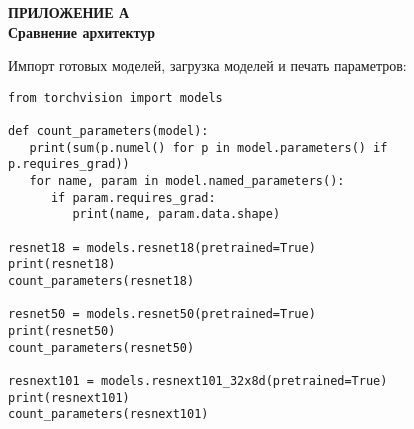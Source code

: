 \newpage
\begin{center}
	\textbf{ПРИЛОЖЕНИЕ А\\ Сравнение архитектур}
\end{center}
Импорт готовых моделей, загрузка моделей и печать параметров:
\small
\begin{verbatim}
from torchvision import models 

def count_parameters(model):
   print(sum(p.numel() for p in model.parameters() if p.requires_grad))
   for name, param in model.named_parameters():
      if param.requires_grad:
         print(name, param.data.shape)

resnet18 = models.resnet18(pretrained=True) 
print(resnet18)
count_parameters(resnet18)
      
resnet50 = models.resnet50(pretrained=True) 
print(resnet50)
count_parameters(resnet50)

resnext101 = models.resnext101_32x8d(pretrained=True) 
print(resnext101)
count_parameters(resnext101)
\end{verbatim}

